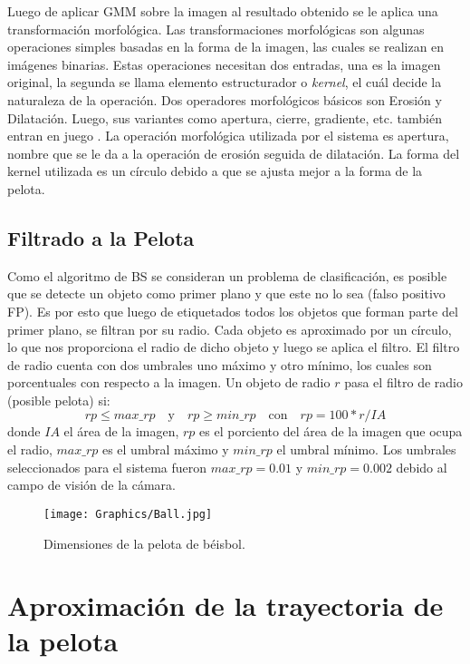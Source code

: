 Luego de aplicar GMM sobre la imagen al resultado obtenido se le aplica una transformación morfológica. Las transformaciones morfológicas son algunas operaciones simples basadas en la forma de la imagen, las cuales se realizan en imágenes binarias. Estas operaciones necesitan dos entradas, una es la imagen original, la segunda se llama elemento estructurador o \textit{kernel}, el cuál decide la naturaleza de la operación. Dos operadores morfológicos básicos son Erosión y Dilatación. Luego, sus variantes como apertura, cierre, gradiente, etc. también entran en juego \cite{MorphologicalTransformationsOpenCV}. La operación morfológica utilizada por el sistema es apertura, nombre que se le da a la operación de erosión seguida de dilatación. La forma del kernel utilizada es un círculo debido a que se ajusta mejor a la forma de la pelota.

\subsection{Filtrado a la Pelota}

Como el algoritmo de BS se consideran un problema de clasificación, es posible que se detecte un objeto como primer plano y que este no lo sea (falso positivo FP). Es por esto que luego de etiquetados todos los objetos que forman parte del primer plano, se filtran por su radio. Cada objeto es aproximado por un círculo, lo que nos proporciona el radio de dicho objeto y luego se aplica el filtro. El filtro de radio cuenta con dos umbrales uno máximo y otro mínimo, los cuales son porcentuales con respecto a la imagen. Un objeto de radio $r$ pasa el filtro de radio (posible pelota) si:
$$rp \leq max\_rp \quad \text{y} \quad rp \geq min\_rp \quad \text{con} \quad rp = 100*r/IA$$
donde $IA$ el área de la imagen, $rp$ es el porciento del área de la imagen que ocupa el radio, $max\_rp$ es el umbral máximo y $min\_rp$ el umbral mínimo. Los umbrales seleccionados para el sistema fueron $max\_rp = 0.01$ y $min\_rp = 0.002$ debido al campo de visión de la cámara. 

\begin{figure}[!h]
    \centering
    \texttt{[image: Graphics/Ball.jpg]}
    \caption{Dimensiones de la pelota de béisbol.}
    \label{fig:BallDimentions}
\end{figure}

\section{Aproximación de la trayectoria de la pelota}

